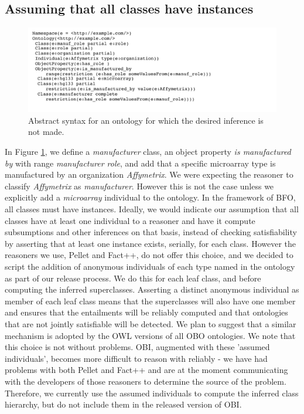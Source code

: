 \documentclass{elsart}       %
\begin{document}
\subsection{Assuming that all classes have instances}

\begin{figure}[t]
\centering \includegraphics*[width=1\columnwidth]{instances}
\caption{Abstract syntax for an ontology for which the desired inference is not made.}
\label{fig:instances}
\end{figure}

In Figure \ref{fig:instances}, we define a \emph{manufacturer} class, an object property \emph{is manufactured by} with range \emph{manufacturer role}, and add that a specific microarray type is manufactured by an organization \emph{Affymetrix}.
We were expecting the reasoner to classify \emph{Affymetrix} as \emph{manufacturer}.
However this is not the case unless we explicitly add a \emph{microarray} individual to the ontology.
In the framework of BFO, all classes must have instances.
Ideally, we would indicate our assumption that all classes have at least one individual to a reasoner and have it compute subsumptions and other inferences on that basis, instead of checking satisfiability by asserting that at least one instance exists, serially, for each class.
However the reasoners we use, Pellet\cite{pellet} and Fact++\cite{fact}, do not offer this choice, and we decided to script the addition of anonymous individuals of each type named in the ontology as part of our release process.
We do this for each leaf class, and before computing the inferred superclasses.
Asserting a distinct anonymous individual as member of each leaf class means that the superclasses will also have one member and ensures that the entailments will be reliably computed and that ontologies that are not jointly satisfiable will be detected.
We plan to suggest that a similar mechanism is adopted by the OWL versions of all OBO ontologies.
We note that this choice is not without problems.
OBI, augmented with these 'assumed individuals', becomes more difficult to reason with reliably - we have had problems with both Pellet and Fact++ and are at the moment communicating with the developers of those reasoners to determine the source of the problem.
Therefore, we currently use the assumed individuals to compute the inferred class hierarchy, but do not include them in the released version of OBI.
\end{document}
